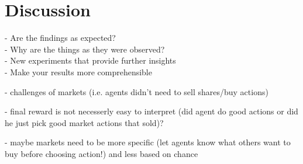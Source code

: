 %
%
\chapter{Discussion}\label{sec:Discussion}
- Are the findings as expected? \\
- Why are the things as they were observed? \\
- New experiments that provide further insights \\
- Make your results more comprehensible

- challenges of markets (i.e. agents didn't need to sell shares/buy actions)

- final reward is not necesserly easy to interpret (did agent do good actions or did he just pick good market actions that sold)?

- maybe markets need to be more specific (let agents know what others want to buy before choosing action!) and less based on chance
